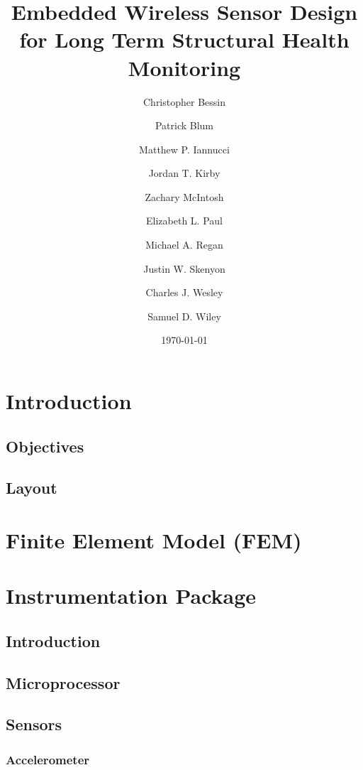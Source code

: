 \documentclass[12pt]{report}
\title{\vspace{-5mm}
	\fontsize{20pt}{10pt}\selectfont
	Embedded Wireless Sensor Design for Long Term Structural Health Monitoring
}
\author[2]{Christopher Bessin}
\author[1]{Patrick Blum}
\author[1]{Matthew P. Iannucci}
\author[1]{Jordan T. Kirby}
\author[1]{Zachary McIntosh}
\author[2]{Elizabeth L. Paul}
\author[1]{Michael A. Regan}
\author[2]{Justin W. Skenyon}
\author[1]{Charles J. Wesley}
\author[1]{Samuel D. Wiley}
\affil[1]{Finite Element Modelling}
\affil[2]{Instrumentation Development}
\date{\normalsize\vspace{-3mm}\today}
\begin{document}
\maketitle




\begin{abstract}

\end{abstract}

\tableofcontents
\listoffigures
\listoftables

\chapter{Introduction}
\label{ch:Paper_Introduction}
	\section{Objectives}
		
	\section{Layout}
		
		
\chapter{Finite Element Model (FEM)}
\label{ch:FEM}
	

\chapter{Instrumentation Package}
\label{ch:Instrumentation}
	\section{Introduction}
		
	\section{Microprocessor}
		\label{sec:uProcessor}
		
	\section{Sensors}
		\subsection{Accelerometer}
			
\end{document}
